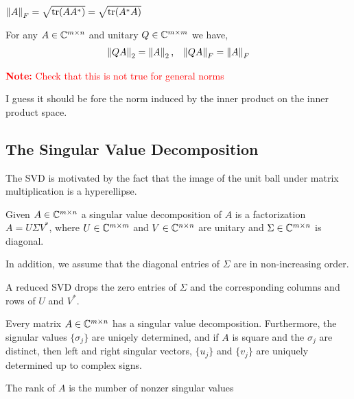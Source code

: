 \documentclass[12pt]{article}
\newcommand{\note}[1]{\textcolor{red}{\textbf{Note:} #1}}
\begin{document}
\begin{theorem}
\( \left\lVert A\right\rVert_F  = \sqrt{\operatorname{tr}(AA^*)} = \sqrt{\operatorname{tr}(A^*A)} \)
\end{theorem}

\begin{theorem}
For any \( A\in\mathbb{C}^{m\times n} \) and unitary \( Q\in \mathbb{C}^{m\times m} \) we have,
\begin{align*}
    \left\lVert QA\right\rVert_2 = \left\lVert A\right\rVert_2, && \left\lVert QA\right\rVert_F = \left\lVert A\right\rVert_F
\end{align*}
\end{theorem}

\note{Check that this is not true for general norms}

I guess it should be fore the norm induced by the inner product on the inner product space.

\subsection{The Singular Value Decomposition}
The SVD is motivated by the fact that the image of the unit ball under matrix multiplication is a hyperellipse.

\begin{definition}
Given \( A\in\mathbb{C}^{m\times n} \) a singular value decomposition of \( A \) is a factorization  \( A = U\Sigma V^* \), where \( U\in \mathbb{C}^{m\times m} \) and \( V\in\mathbb{C}^{n\times n} \) are unitary and \( \Sigma \in \mathbb{C}^{m\times n} \) is diagonal.

In addition, we assume that the diagonal entries of \( \Sigma \) are in non-increasing order.

A reduced SVD drops the zero entries of \( \Sigma \) and the corresponding columns and rows of \( U \) and \( V^* \).
\end{definition}

\begin{theorem}
Every matrix \( A\in\mathbb{C}^{m\times n} \) has a singular value decomposition. Furthermore, the signular values \( \{\sigma_j\} \) are uniqely determined, and if \( A \) is square and the \( \sigma_j \) are distinct, then left and right singular vectors, \( \{u_j\} \) and \( \{v_j\} \) are uniquely determined up to complex signs.
\end{theorem}

\begin{theorem}
The rank of \( A \) is the number of nonzer singular values
\end{theorem}
\end{document}
